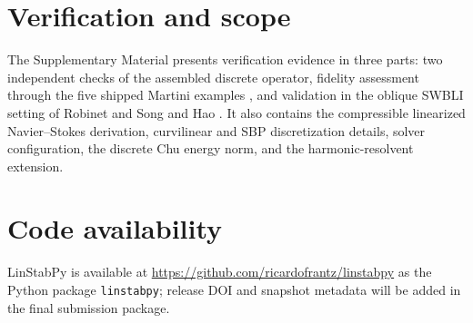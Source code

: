 \documentclass[10pt]{article}
\begin{document}
\section{Verification and scope}

The Supplementary Material presents verification evidence in three parts:
two independent checks of the assembled discrete operator, fidelity assessment
through the five shipped Martini examples \citep{martini2024}, and validation
in the oblique SWBLI setting of Robinet \citep{robinet2007bifurcations} and
Song and Hao \citep{song2023global}. It also contains the compressible
linearized Navier--Stokes derivation, curvilinear and SBP discretization
details, solver configuration, the discrete Chu energy norm, and the
harmonic-resolvent extension.

\section{Code availability}

LinStabPy is available at \url{https://github.com/ricardofrantz/linstabpy} as
the Python package \texttt{linstabpy}; release DOI and snapshot metadata will
be added in the final submission package.



\end{document}
